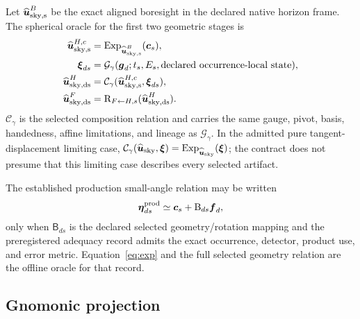 Let $\widehat{\boldsymbol u}^{B}_{\rm sky,s}$ be the exact aligned boresight in the declared native
horizon frame.  The spherical oracle for the first two geometric stages is
\begin{align}
 \widehat{\boldsymbol u}^{H,c}_{\rm sky,s}
   &=\operatorname{Exp}_{\widehat{\boldsymbol u}^{B}_{\rm sky,s}}
     (\boldsymbol c_s),
   \label{eq:corrected-boresight}\\
 \boldsymbol\xi_{ds}
   &=\mathcal G_\gamma(\boldsymbol g_d;t_s,E_s,
      \text{declared occurrence-local state}),
   \label{eq:geometry-realization}\\
 \widehat{\boldsymbol u}^{H}_{\rm sky,ds}
   &=\mathcal C_\gamma(\widehat{\boldsymbol u}^{H,c}_{\rm sky,s},
      \boldsymbol\xi_{ds}),
   \label{eq:detector-direction}\\
 \widehat{\boldsymbol u}^{F}_{\rm sky,ds}
   &=\mathsf R_{F\leftarrow H,s}
      (\widehat{\boldsymbol u}^{H}_{\rm sky,ds}).
   \label{eq:frame-operation}
\end{align}
$\mathcal C_\gamma$ is the selected composition relation and carries the same
gauge, pivot, basis, handedness, affine limitations, and lineage as
$\mathcal G_\gamma$.  In the admitted pure tangent-displacement limiting
case, $\mathcal C_\gamma(\widehat{\boldsymbol u}_{\rm sky},\boldsymbol\xi)=
\operatorname{Exp}_{\widehat{\boldsymbol u}_{\rm sky}}(\boldsymbol\xi)$; the contract does not
presume that this limiting case describes every selected artifact.

The established production small-angle relation may be written
\begin{equation}
 \boldsymbol\eta_{ds}^{\rm prod}\simeq
 \boldsymbol c_s+\mathsf B_{ds}\boldsymbol f_d,
 \label{eq:small-angle}
\end{equation}
only when $\mathsf B_{ds}$ is the declared selected geometry/rotation mapping
and the preregistered adequacy record admits the exact occurrence, detector,
product use, and error metric.  Equation~\ref{eq:exp} and the full selected
geometry relation are the offline oracle for that record.

\subsection{Gnomonic projection}

